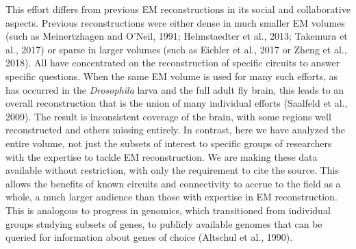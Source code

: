 \documentclass{article}
\begin{document}
This effort differs from previous EM reconstructions in its social and collaborative aspects. Previous reconstructions were either dense in much smaller EM volumes (such as Meinertzhagen and O’Neil, 1991; Helmstaedter et al., 2013; Takemura et al., 2017) or sparse in larger volumes (such as Eichler et al., 2017 or Zheng et al., 2018). All have concentrated on the reconstruction of specific circuits to answer specific questions. When the same EM volume is used for many such efforts, as has occurred in the \emph{Drosophila} larva and the full adult fly brain, this leads to an overall reconstruction that is the union of many individual efforts (Saalfeld et al., 2009). The result is inconsistent coverage of the brain, with some regions well reconstructed and others missing entirely. In contrast, here we have analyzed the entire volume, not just the subsets of interest to specific groups of researchers with the expertise to tackle EM reconstruction. We are making these data available without restriction, with only the requirement to cite the source. This allows the benefits of known circuits and connectivity to accrue to the field as a whole, a much larger audience than those with expertise in EM reconstruction. This is analogous to progress in genomics, which transitioned from individual groups studying subsets of genes, to publicly available genomes that can be queried for information about genes of choice (Altschul et al., 1990).
\end{document}
